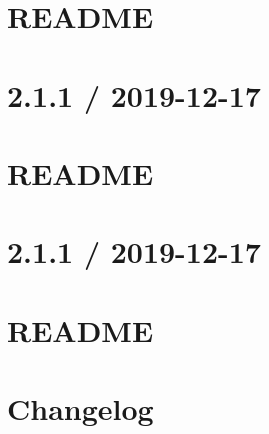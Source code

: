 \let\mypdfximage\pdfximage\def\pdfximage{\immediate\mypdfximage}\documentclass[twoside]{book}
\newcommand{\+}{\discretionary{\mbox{\scriptsize$\hookleftarrow$}}{}{}}
\begin{document}
\chapter{R\+E\+A\+D\+ME}
\label{md_heap-visualizer_node_modules_string_8prototype_8trimend__r_e_a_d_m_e}

\chapter{2.1.1 / 2019-\/12-\/17}
\label{md_heap-visualizer_node_modules_string_8prototype_8trimleft__c_h_a_n_g_e_l_o_g}

\chapter{R\+E\+A\+D\+ME}
\label{md_heap-visualizer_node_modules_string_8prototype_8trimleft__r_e_a_d_m_e}

\chapter{2.1.1 / 2019-\/12-\/17}
\label{md_heap-visualizer_node_modules_string_8prototype_8trimright__c_h_a_n_g_e_l_o_g}

\chapter{R\+E\+A\+D\+ME}
\label{md_heap-visualizer_node_modules_string_8prototype_8trimright__r_e_a_d_m_e}

\chapter{Changelog}
\label{md_heap-visualizer_node_modules_string_8prototype_8trimstart__c_h_a_n_g_e_l_o_g}

\end{document}
